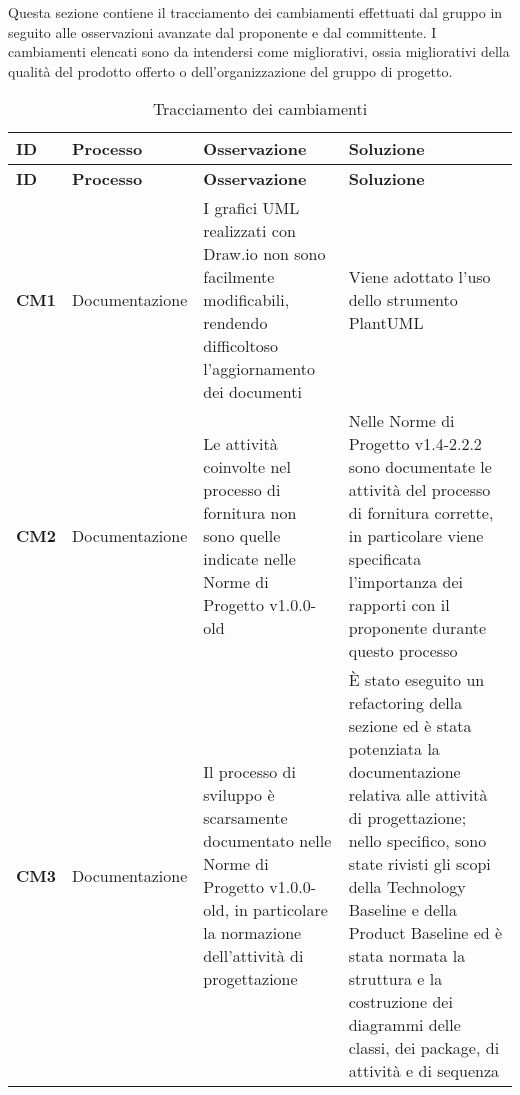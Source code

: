 \documentclass[../piano-di-qualifica.tex]{subfiles}
\begin{document}
Questa sezione contiene il tracciamento dei cambiamenti effettuati dal gruppo in seguito alle osservazioni avanzate dal proponente e dal committente. I cambiamenti elencati sono da intendersi come migliorativi, ossia migliorativi della qualità del prodotto offerto o dell'organizzazione del gruppo di progetto.

\renewcommand{\arraystretch}{2} %
\begin{longtable}[H]{>{\centering\bfseries}m{2.5cm} >{\centering}m{2.5cm} >{\centering}m{5.5cm} >{\centering\arraybackslash}m{5.5cm}}
  \caption{Tracciamento dei cambiamenti}%
  \label{tab:tracciamento_dei_cambiamenti}                                                    \\
  \rowcolor{lightgray}
  {\textbf{ID}} & {\textbf{Processo}} & {\textbf{Osservazione}} & {\textbf{Soluzione}}  \\
  \endfirsthead%
  \rowcolor{lightgray}
  {\textbf{ID}} & {\textbf{Processo}} & {\textbf{Osservazione}} & {\textbf{Soluzione}}  \\
  \endhead%
  \rowcolor{white}
  \multicolumn{4}{c}{\textit{Continua alla pagina successiva}}
  \endfoot%
  \endlastfoot%
CM1  & Documentazione                                & I grafici UML realizzati con Draw.io non sono facilmente modificabili, rendendo difficoltoso l'aggiornamento dei documenti                                                    & Viene adottato l'uso dello strumento PlantUML                                                                                                                                                                                                                                                                                                       \\
CM2  & Documentazione                                & Le attività coinvolte nel processo di fornitura non sono quelle indicate nelle Norme di Progetto v1.0.0-old                                                                   & Nelle Norme di Progetto v1.4-2.2.2 sono documentate le attività del processo di fornitura corrette, in particolare viene specificata l’importanza dei rapporti con il proponente durante questo processo                                                                                                                                            \\
CM3  & Documentazione                                & Il processo di sviluppo è scarsamente documentato nelle Norme di Progetto v1.0.0-old, in particolare la normazione dell’attività di progettazione                             & È stato eseguito un refactoring della sezione ed è stata potenziata la documentazione relativa alle attività di progettazione; nello specifico, sono state rivisti gli scopi della Technology Baseline e della Product Baseline ed è stata normata la struttura e la costruzione dei diagrammi delle classi, dei package, di attività e di sequenza \\

\end{longtable}
\end{document}

